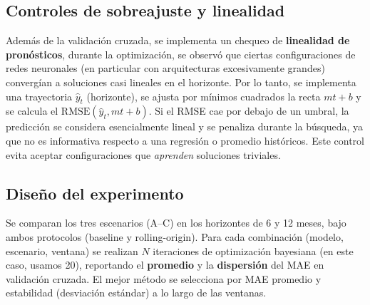 \documentclass[12pt,letterpaper]{article}
\begin{document}
\subsection{Controles de sobreajuste y linealidad}
Además de la validación cruzada, se implementa un chequeo de \textbf{linealidad de pronósticos}, durante la optimización, se observó que ciertas configuraciones de redes neuronales (en particular
con arquitecturas excesivamente grandes) convergían a soluciones casi lineales en el horizonte. Por lo tanto, se implementa una trayectoria \(\hat{y}_{t}\) (horizonte), se ajusta por mínimos cuadrados la recta \(m t + b\) y se calcula el \(\text{RMSE}(\hat{y}_t, m t + b)\). Si el RMSE cae por debajo de un umbral, la predicción se considera esencialmente lineal y se penaliza durante la búsqueda, ya que no es informativa respecto a una regresión o promedio históricos. Este control evita aceptar configuraciones que \textit{aprenden} soluciones triviales.

\subsection{Diseño del experimento}
Se comparan los tres escenarios (A–C) en los horizontes de 6 y 12 meses, bajo ambos protocolos (baseline y rolling-origin). Para cada combinación (modelo, escenario, ventana) se realizan \(N\) iteraciones de optimización bayesiana (en este caso, usamos 20), reportando el \textbf{promedio} y la \textbf{dispersión} del MAE en validación cruzada. El mejor método se selecciona por MAE promedio y estabilidad (desviación estándar) a lo largo de las ventanas.
\end{document}
